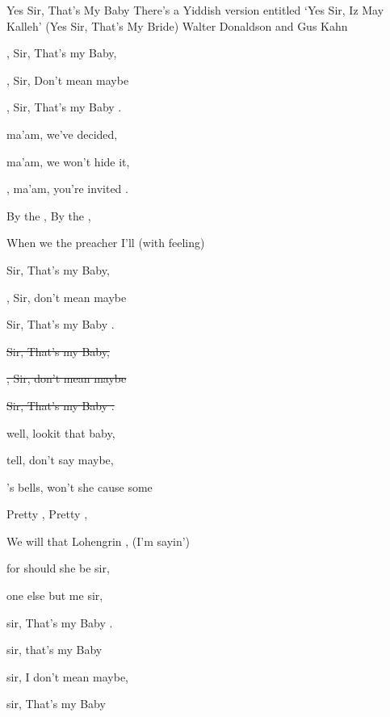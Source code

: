 \begin{SBSong}{Yes Sir, That's My Baby}
  {There's a Yiddish version entitled `Yes Sir, Iz May Kalleh' (Yes Sir, That's My Bride)}
  {Walter Donaldson and Gus Kahn}
  \begin{SBVerse*}
    , Sir, That's my Baby,
    
    , Sir, Don't mean maybe
    
    , Sir, That's my Baby . 
    
     ma'am, we've decided,
    
     ma'am, we won't hide it,
    
    , ma'am, you're invited .
    
    By the , By the ,
    
    When we  the preacher I'll  (with feeling)
    
     Sir, That's my Baby,
    
    , Sir, don't mean maybe
    
     Sir, That's my Baby . 
    
    \sout{ Sir, That's my Baby,}
    
    \sout{, Sir, don't mean maybe}
    
    \sout{ Sir, That's my Baby . }
    
     well, lookit that baby,
    
     tell, don't say maybe,
    
    's bells, won't she cause some 
    
    Pretty , Pretty ,
    
    We will  that Lohengrin , (I'm sayin')
    
     for should she be sir,
    
     one else but me sir,
    
     sir, That's my Baby . 
    
     sir, that's my Baby
    
     sir, I don't mean maybe,
    
     sir, That's my Baby 
 \end{SBVerse*}
\end{SBSong}
